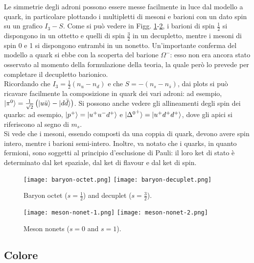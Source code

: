 Le simmetrie degli adroni possono essere messe facilmente in luce dal modello a quark, in particolare plottando i multipletti di mesoni e barioni con un dato spin su un grafico $ I_3 - S $. Come si può vedere in Figg. \ref{baryons}-\ref{mesons}, i barioni di spin $ \frac{1}{2} $ si dispongono in un ottetto e quelli di spin $ \frac{3}{2} $ in un decupletto, mentre i mesoni di spin 0 e 1 si dispongono entrambi in un nonetto. Un'importante conferma del modello a quark si ebbe con la scoperta del barione $ \Omega^- $: esso non era ancora stato osservato al momento della formulazione della teoria, la quale però lo prevede per completare il decupletto barionico.\\
Ricordando che $ I_3 = \frac{1}{2} \left( n_u - n_d \right) $ e che $ S = - \left( n_s - n_{\bar{s}} \right) $, dai plots si può ricavare facilmente la composizione in quark dei vari adroni: ad esempio, $ \ket{\pi^0} = \frac{1}{\sqrt{2}} \left( \ket{u\bar{u}} - \ket{d\bar{d}} \right) $. Si possono anche vedere gli allineamenti degli spin dei quarks: ad esempio, $ \ket{p^+} = \ket{u^+ u^- d^+} $ e $ \ket{{\Delta^0}^+} = \ket{u^+ d^+ d^+} $, dove gli apici si riferiscono al segno di $ m_s $.\\
Si vede che i mesoni, essendo composti da una coppia di quark, devono avere spin intero, mentre i barioni semi-intero. Inoltre, va notato che i quarks, in quanto fermioni, sono soggetti al principio d'esclusione di Pauli: il loro ket di stato è determinato dal ket spaziale, dal ket di flavour e dal ket di spin.

\begin{figure}
	\centering
	\texttt{[image: baryon-octet.png]}
	\texttt{[image: baryon-decuplet.png]}
	\caption{Baryon octet ($ s = \frac{1}{2} $) and decuplet ($ s = \frac{3}{2} $).}
	\label{baryons}
\end{figure}
\begin{figure}
	\centering
	\texttt{[image: meson-nonet-1.png]}
	\texttt{[image: meson-nonet-2.png]}
	\caption{Meson nonets ($ s = 0 $ and $ s = 1 $).}
	\label{mesons}
\end{figure}

\subsection{Colore}

